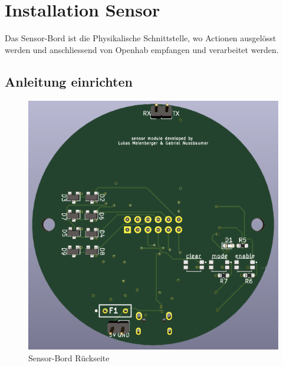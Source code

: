\clearpage
\section{Installation Sensor}\label{sec:Sensor}

Das Sensor-Bord ist die Physikalische Schnittstelle, wo Actionen ausgelösst werden und anschliessend von Openhab empfangen und verarbeitet werden.
\subsection{Anleitung einrichten}
\begin{figure}[H]
	\begin{center}
		\begin{minipage}[b]{.3\linewidth} %
			\includegraphics[width=\textwidth]{graphics/Sensor1.PNG}
			\caption{Sensor-Bord Rückseite}
		\end{minipage}
		\hspace{.1\linewidth}%
		\begin{minipage}[b]{.3\linewidth} %

\end{minipage}
\end{center}
\end{figure}
